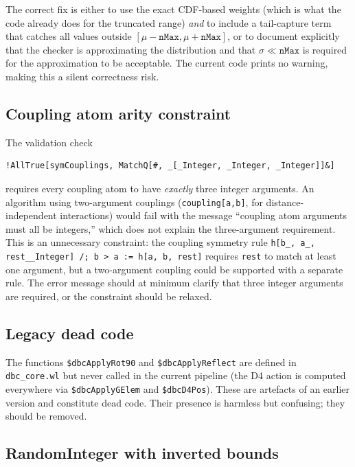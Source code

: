 \documentclass[12pt,a4paper]{article}
\theoremstyle{critical}
\theoremstyle{remark}
\theoremstyle{verified}
\begin{document}
The correct fix is either to use the exact CDF-based weights (which is what the
code already does for the truncated range) \emph{and} to include a tail-capture
term that catches all values outside $[\mu-\texttt{nMax}, \mu+\texttt{nMax}]$,
or to document explicitly that the checker is approximating the distribution and
that $\sigma \ll \texttt{nMax}$ is required for the approximation to be
acceptable.  The current code prints no warning, making this a silent
correctness risk.

\subsection{Coupling atom arity constraint}
\label{sec:arity}

The validation check
\begin{lstlisting}
!AllTrue[symCouplings, MatchQ[#, _[_Integer, _Integer, _Integer]]&]
\end{lstlisting}
requires every coupling atom to have \emph{exactly} three integer arguments.  An
algorithm using two-argument couplings (\texttt{coupling[a,b]}, for
distance-independent interactions) would fail with the message ``coupling atom
arguments must all be integers,'' which does not explain the three-argument
requirement.  This is an unnecessary constraint: the coupling symmetry rule
\texttt{h[b\_, a\_, rest\_\_Integer] /; b > a := h[a, b, rest]} requires
\texttt{rest} to match at least one argument, but a two-argument coupling could
be supported with a separate rule.  The error message should at minimum clarify
that three integer arguments are required, or the constraint should be relaxed.

\subsection{Legacy dead code}
\label{sec:dead}

The functions \texttt{\$dbcApplyRot90} and \texttt{\$dbcApplyReflect} are defined
in \texttt{dbc\_core.wl} but never called in the current pipeline (the D4 action
is computed everywhere via \texttt{\$dbcApplyGElem} and \texttt{\$dbcD4Pos}).
These are artefacts of an earlier version and constitute dead code.  Their
presence is harmless but confusing; they should be removed.

\subsection{RandomInteger with inverted bounds}
\label{sec:inverted}
\end{document}
